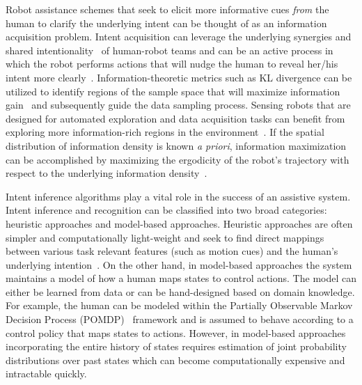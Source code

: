 \documentclass[letterpaper, 10 pt, conference]{ieeeconf}  %
\begin{document}
Robot assistance schemes that seek to elicit more informative cues \textit{from} the human to clarify the underlying intent can be thought of as an information acquisition problem. Intent acquisition can leverage the underlying synergies and shared intentionality~\cite{tomasello2007shared} of human-robot teams and can be an active process in which the robot performs actions 
that will nudge the human to reveal her/his intent more clearly~\cite{sadigh2016information}. Information-theoretic metrics such as KL divergence can be utilized to identify regions of the sample space that will maximize information gain~\cite{tong2001active} and subsequently guide the data sampling process. 
Sensing robots that are designed for automated exploration and data acquisition tasks can benefit from exploring more information-rich regions in the environment~\cite{atanasov2014information}. 
If the spatial distribution of information density is known \textit{a priori}, information maximization can be accomplished by maximizing the ergodicity of the robot's trajectory with respect to the underlying information density~\cite{miller2016ergodic}. 

Intent inference algorithms play a vital role in the success of an assistive system. Intent inference and recognition can be classified into two broad categories: heuristic approaches and model-based approaches. Heuristic approaches are often simpler and computationally light-weight and seek to find direct mappings between various task relevant features (such as motion cues) and the human's underlying intention~\cite{baker2007goal}. On the other hand, in model-based approaches the system maintains a model of how a human maps states to control actions. The model can either be learned from data or can be hand-designed based on domain knowledge. For example, the human can be modeled within the Partially Observable Markov Decision Process (POMDP)~\cite{taha2011pomdp} framework and is assumed to behave according to a control policy that maps states to actions. However, in model-based approaches incorporating the entire history of states requires estimation of joint probability distributions over past states which can become computationally expensive and intractable quickly.
\end{document}
